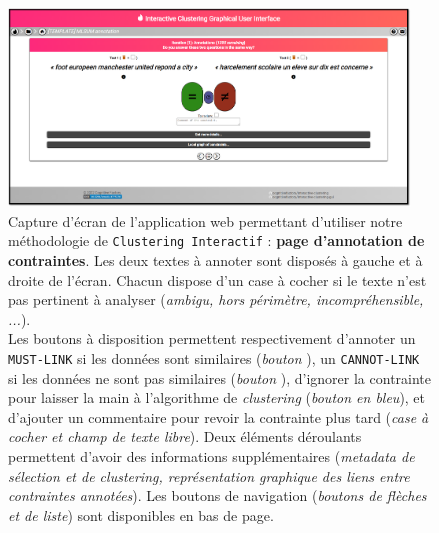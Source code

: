 			\begin{figure}[!htb]
				\centering
				\includegraphics[width=0.95\textwidth]{figures/etude-temps-annotation-0application-annotation}
				\caption{
					Capture d'écran de l'application web permettant d'utiliser notre méthodologie de \texttt{Clustering Interactif} : \textbf{page d'annotation de contraintes}.
					Les deux textes à annoter sont disposés à gauche et à droite de l'écran.
					Chacun dispose d'un case à cocher si le texte n'est pas pertinent à analyser (\textit{ambigu, hors périmètre, incompréhensible, ...}).\\
					Les boutons à disposition permettent respectivement d'annoter un \texttt{MUST-LINK} si les données sont similaires (\textit{bouton \textguillemets{\textcolor{colorApplicationMUSTLINK}{\faEquals}}}), un \texttt{CANNOT-LINK} si les données ne sont pas similaires (\textit{bouton \textguillemets{\textcolor{colorApplicationCANNOTLINK}{\faNotEqual}}}), d'ignorer la contrainte pour laisser la main à l'algorithme de \textit{clustering} (\textit{bouton en bleu}), et d'ajouter un commentaire pour revoir la contrainte plus tard (\textit{case à cocher et champ de texte libre}).
					Deux éléments déroulants permettent d'avoir des informations supplémentaires (\textit{metadata de sélection et de \textit{clustering}, représentation graphique des liens entre contraintes annotées}).
					Les boutons de navigation (\textit{boutons de flèches et de liste}) sont disponibles en bas de page.
				}
				\label{figure:4.3.1-ETUDE-COUTS-TEMPS-ANNOTATION-APPLICATION-ANNOTATION}
			\end{figure}
